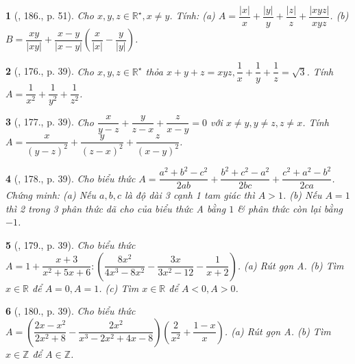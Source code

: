 \documentclass{article}
\newtheorem{baitoan}{}
\begin{document}
\begin{baitoan}[\cite{Tuyen_Toan_8_old}, 186., p. 51]
	Cho $x,y,z\in\mathbb{R}^\star,x\ne y$. Tính: (a) $A = \dfrac{|x|}{x} + \dfrac{|y|}{y} + \dfrac{|z|}{z} + \dfrac{|xyz|}{xyz}$. (b) $B = \dfrac{xy}{|xy|} + \dfrac{x - y}{|x - y|}\left(\dfrac{x}{|x|} - \dfrac{y}{|y|}\right)$.
\end{baitoan}

\begin{baitoan}[\cite{Tuyen_Toan_8}, 176., p. 39]
	Cho $x,y,z\in\mathbb{R}^\star$ thỏa $x + y + z = xyz,\dfrac{1}{x} + \dfrac{1}{y} + \dfrac{1}{z} = \sqrt{3}$. Tính $A = \dfrac{1}{x^2} + \dfrac{1}{y^2} + \dfrac{1}{z^2}$.
\end{baitoan}

\begin{baitoan}[\cite{Tuyen_Toan_8}, 177., p. 39]
	Cho $\dfrac{x}{y - z} + \dfrac{y}{z - x} + \dfrac{z}{x - y} = 0$ với $x\ne y,y\ne z,z\ne x$. Tính $A = \dfrac{x}{(y - z)^2} + \dfrac{y}{(z - x)^2} + \dfrac{z}{(x - y)^2}$.
\end{baitoan}

\begin{baitoan}[\cite{Tuyen_Toan_8}, 178., p. 39]
	Cho biểu thức $A = \dfrac{a^2 + b^2 - c^2}{2ab} + \dfrac{b^2 + c^2 - a^2}{2bc} + \dfrac{c^2 + a^2 - b^2}{2ca}$. Chứng minh: (a) Nếu $a,b,c$ là độ dài 3 cạnh 1 tam giác thì $A > 1$. (b) Nếu $A = 1$ thì 2 trong 3 phân thức dã cho của biểu thức A bằng $1$ \& phân thức còn lại bằng $-1$.
\end{baitoan}

\begin{baitoan}[\cite{Tuyen_Toan_8}, 179., p. 39]
	Cho biểu thức $A = 1 + \dfrac{x + 3}{x^2 + 5x + 6}:\left(\dfrac{8x^2}{4x^3 - 8x^2} - \dfrac{3x}{3x^2 - 12} - \dfrac{1}{x + 2}\right)$. (a) Rút gọn A. (b) Tìm $x\in\mathbb{R}$ để $A = 0,A = 1$. (c) Tìm $x\in\mathbb{R}$ để $A < 0,A > 0$.
\end{baitoan}

\begin{baitoan}[\cite{Tuyen_Toan_8}, 180., p. 39]
	Cho biểu thức $A = \left(\dfrac{2x - x^2}{2x^2 + 8} - \dfrac{2x^2}{x^3 - 2x^2 + 4x - 8}\right)\left(\dfrac{2}{x^2} + \dfrac{1 - x}{x}\right)$. (a) Rút gọn A. (b) Tìm $x\in\mathbb{Z}$ để $A\in\mathbb{Z}$.
\end{baitoan}


\printbibliography[heading=bibintoc]
	
\end{document}

